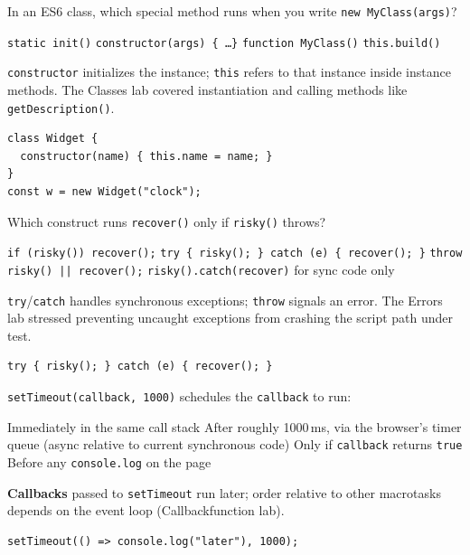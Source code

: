 \newpage


\question[4]
In an ES6 class, which special method runs when you write \texttt{new MyClass(args)}?
\begin{choices}
  \choice \texttt{static init()}
  \CorrectChoice \texttt{constructor(args) \{ \ldots \}}
  \choice \texttt{function MyClass()}
  \choice \texttt{this.build()}
\end{choices}
\begin{solution}
  \texttt{constructor} initializes the instance; \texttt{this} refers to that instance inside instance methods. The Classes lab covered instantiation and calling methods like \texttt{getDescription()}.
\begin{lstlisting}[style=js]
class Widget {
  constructor(name) { this.name = name; }
}
const w = new Widget("clock");
\end{lstlisting}
\end{solution}

\question[4]
Which construct runs \texttt{recover()} only if \texttt{risky()} throws?
\begin{choices}
  \choice \texttt{if (risky()) recover();}
  \CorrectChoice \texttt{try \{ risky(); \} catch (e) \{ recover(); \}}
  \choice \texttt{throw risky() || recover();}
  \choice \texttt{risky().catch(recover)} for sync code only
\end{choices}
\begin{solution}
  \texttt{try}/\texttt{catch} handles synchronous exceptions; \texttt{throw} signals an error. The Errors lab stressed preventing uncaught exceptions from crashing the script path under test.
\begin{lstlisting}[style=js]
try { risky(); } catch (e) { recover(); }
\end{lstlisting}
\end{solution}

\question[4]
\texttt{setTimeout(callback, 1000)} schedules the \texttt{callback} to run:
\begin{choices}
  \choice Immediately in the same call stack
  \CorrectChoice After roughly 1000\,ms, via the browser's timer queue (async relative to current synchronous code)
  \choice Only if \texttt{callback} returns \texttt{true}
  \choice Before any \texttt{console.log} on the page
\end{choices}
\begin{solution}
  \textbf{Callbacks} passed to \texttt{setTimeout} run later; order relative to other macrotasks depends on the event loop (Callbackfunction lab).
\begin{lstlisting}[style=js]
setTimeout(() => console.log("later"), 1000);
\end{lstlisting}
\end{solution}

